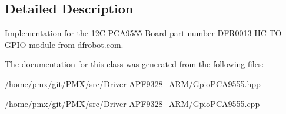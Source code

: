 \subsection{Detailed Description}
Implementation for the 12C P\+C\+A9555 Board part number D\+F\+R0013 I\+IC TO G\+P\+IO module from dfrobot.\+com. 

The documentation for this class was generated from the following files\+:\begin{DoxyCompactItemize}
\item 
/home/pmx/git/\+P\+M\+X/src/\+Driver-\/\+A\+P\+F9328\+\_\+\+A\+R\+M/\hyperlink{Driver-APF9328__ARM_2GpioPCA9555_8hpp}{Gpio\+P\+C\+A9555.\+hpp}\item 
/home/pmx/git/\+P\+M\+X/src/\+Driver-\/\+A\+P\+F9328\+\_\+\+A\+R\+M/\hyperlink{Driver-APF9328__ARM_2GpioPCA9555_8cpp}{Gpio\+P\+C\+A9555.\+cpp}\end{DoxyCompactItemize}
